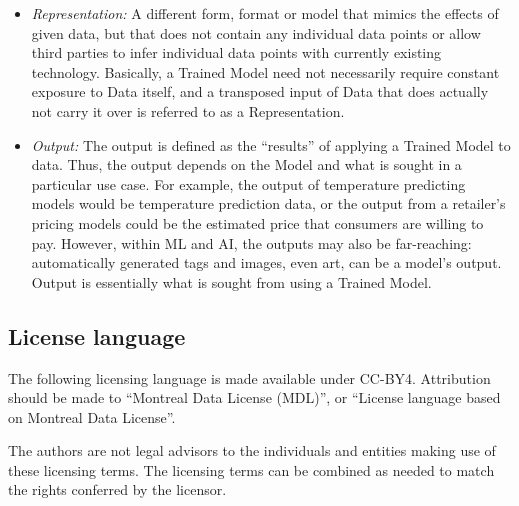 \documentclass{article} %
\begin{document}
\begin{itemize}
    \item \textit{Representation:}  A different form, format or model that mimics the effects of given data, but that does not contain any individual data points or allow third parties to infer individual data points with currently existing technology. Basically, a Trained Model need not necessarily require constant exposure to Data itself, and a transposed input of Data that does actually not carry it over is referred to as a Representation.
    
    \item \textit{Output: } The output is defined as the “results” of applying a Trained Model to data. Thus, the output depends on the Model and what is sought in a particular use case. For example, the output of temperature predicting models would be temperature prediction data, or the output from a retailer’s pricing models could be the estimated price that consumers are willing to pay. However, within ML and AI, the outputs may also be far-reaching: automatically generated tags and images, even art, can be a model’s output. Output is essentially what is sought from using a Trained Model. 

\end{itemize}

\subsection{License language}
The following licensing language is made available under CC-BY4. Attribution should be made to “Montreal Data License (MDL)”, or “License language based on Montreal Data License”. 

The authors are not legal advisors to the individuals and entities making use of these licensing terms. The licensing terms can be combined as needed to match the rights conferred by the licensor. 
\end{document}
